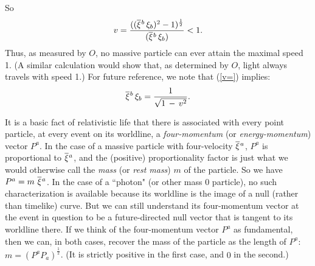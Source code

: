 \documentclass [12] {article}
\theoremstyle{plain}
\numberwithin{figure}{subsection}
\numberwithin{proposition}{subsection}
\begin{document}
So 
\begin{equation}
\label{v=}
v = \frac{((\overline{\xi}\hspace{.05em}^b \, \xi_b)^2 - 1)^{\frac{1}{2}}}
{(\overline{\xi}\hspace{.05em}^b \, \xi_b)}   <  1 . 
\end{equation}
Thus, as measured by $O$, no massive particle can ever attain the maximal speed 1.   (A similar calculation would show that, as determined by $O$,  light always travels with speed 1.) For future reference, we note that (\ref{v=}) implies:
\begin{equation}
\label{Inversion of v =}
\overline{\xi}\hspace{.05em}^b \, \xi_b  = \frac{1}{\sqrt{1 \,  - \, v^2}}.  
\end{equation} 
%
\begin{sloppypar}
It is a basic fact of relativistic life that there is associated with every point particle, at every event on its worldline, a \emph{four-momentum} (or \emph{energy-momentum}) vector $P^a$. In the case of a massive particle with four-velocity $\overline{\xi}\hspace{.05em}^ a$,  $P^a$ is proportional to  $\overline{\xi}\hspace{.05em}^a$,  and the (positive) proportionality factor  is just what we would otherwise call the \emph{mass} (or \emph{rest mass}) $m$ of the particle. So we have   $P^a = m \ \overline{\xi}\hspace{.05em}^a$.   In the case of a ``photon" (or other mass $0$ particle),  no such characterization is available because its worldline is the image of a null (rather than timelike) curve.
But we can still understand its four-momentum vector at the event in question to be a future-directed null vector that is tangent to its worldline there.  If we think of the four-momentum vector $P^a$ as fundamental, then we can, in both cases, recover the mass of the  particle as the length of $P^a$:  $m =  (P^a P_a)^{\frac{1}{2}}$.  (It is strictly positive in the first case, and $0$ in the second.) 
\end{sloppypar} 
\end{document}
